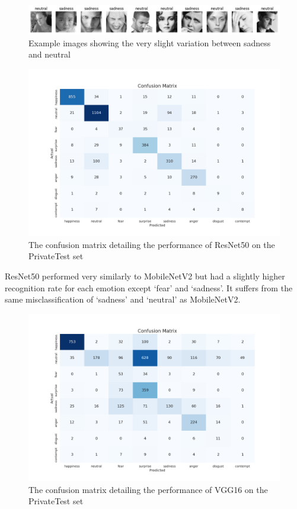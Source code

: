 \begin{figure}[H]
    \centering{}
    \includegraphics[scale=0.38]{fed_images/sadness+neutral.png}
    \caption{Example images showing the very slight variation between sadness and neutral}
    \label{figure:sadneutral}
\end{figure}

\begin{figure}[H]
    \centering{}
    \includegraphics[scale=0.38]{fed_images/conf_matrix_ResNet50.png}
    \caption{The confusion matrix detailing the performance of ResNet50 on the PrivateTest set}
    \label{figure:conf_rn50}
\end{figure}

ResNet50 performed very similarly to MobileNetV2 but had a slightly higher recognition rate for each emotion except `fear' and `sadness'. It suffers from the same misclassification of `sadness' and `neutral' as MobileNetV2.

\begin{figure}[H]
    \centering{}
    \includegraphics[scale=0.38]{fed_images/conf_matrix_VGG16.png}
    \caption{The confusion matrix detailing the performance of VGG16 on the PrivateTest set}
    \label{figure:conf_vgg16}
\end{figure}

